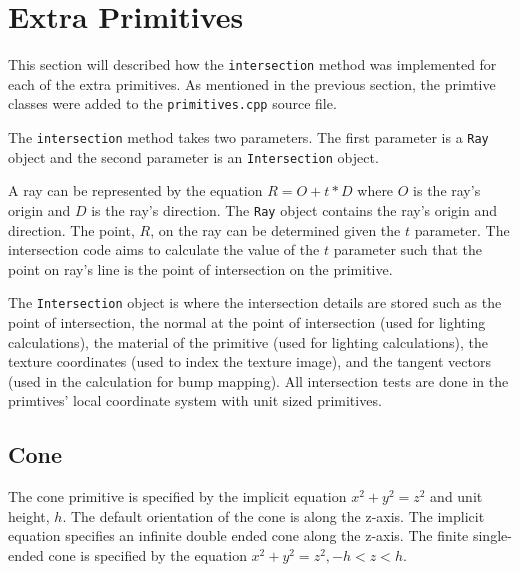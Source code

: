 \section{Extra Primitives}

This section will described how the \verb|intersection| method was
implemented for each of the extra primitives. As mentioned in the previous
section, the primtive classes were added to the \verb|primitives.cpp| source 
file.

The \verb|intersection| method takes two parameters. The first parameter is a
\verb|Ray| object and the second parameter is an \verb|Intersection| object. 

A ray can be represented by the equation $R = O + t*D$ where $O$ is the ray's 
origin and $D$ is the ray's direction. The \verb|Ray| object contains the ray's 
origin and direction. The point, $R$, on the ray can be determined given the $t$ 
parameter. The intersection code aims to calculate the value of the $t$ 
parameter such that the point on ray's line is the point of intersection on the 
primitive. 

The \verb|Intersection| object is where the intersection details are
stored such as the point of intersection, the normal at the point of
intersection (used for lighting calculations), the material of the primitive
(used for lighting calculations), the texture coordinates (used to index the
texture image), and the tangent vectors (used in the calculation for bump
mapping). All intersection tests are done in the primtives' local coordinate
system with unit sized primitives.

\subsection*{Cone}
The cone primitive is specified by the implicit equation $x^2 + y^2 = z^2$ and 
unit height, $h$. The default orientation of the cone is along the z-axis. The 
implicit equation specifies an infinite double ended cone along the z-axis. The 
finite single-ended cone is specified by the equation 
$x^2 + y^2 = z^2, -h < z < h$. 

